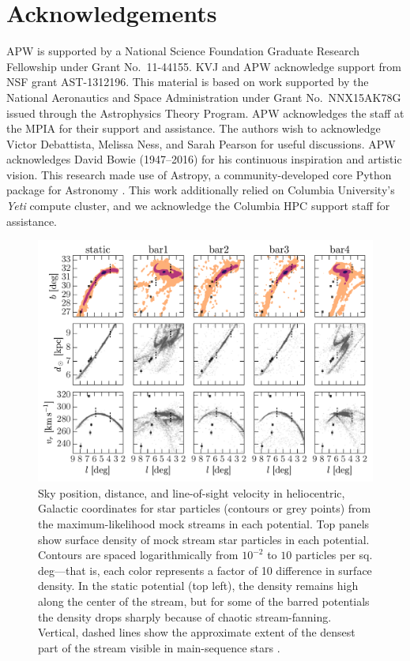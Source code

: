 \section*{Acknowledgements}
APW is supported by a National Science Foundation Graduate Research Fellowship under Grant No.\ 11-44155.
KVJ and APW acknowledge support from NSF grant AST-1312196. 
This material is based on work supported by the National Aeronautics and Space Administration under Grant No.\, NNX15AK78G issued through the Astrophysics Theory Program. 
APW acknowledges the staff at the MPIA for their support and assistance.
The authors wish to acknowledge Victor Debattista, Melissa Ness, and Sarah Pearson for useful discussions.
APW acknowledges David Bowie (1947--2016) for his continuous inspiration and artistic vision.
This research made use of Astropy, a community-developed core Python package for Astronomy \citep{astropy13}.
This work additionally relied on Columbia University's \emph{Yeti} compute cluster, and we acknowledge the Columbia HPC support staff for assistance. \\



\begin{figure}[p]
\begin{center}
\includegraphics[width=\textwidth]{figures/ch4/mockstream0}
\caption{ Sky position, distance, and line-of-sight velocity in heliocentric, Galactic coordinates for star particles (contours or grey points) from the maximum-likelihood mock streams in each potential. Top panels show surface density of mock stream star particles in each potential. Contours are spaced logarithmically from $10^{-2}$ to $10$ particles per sq. deg---that is, each color represents a factor of 10 difference in surface density. In the static potential (top left), the density remains high along the center of the stream, but for some of the barred potentials the density drops sharply because of chaotic stream-fanning. Vertical, dashed lines show the approximate extent of the densest part of the stream visible in main-sequence stars \citep[the segment originally detected in ][]{bernard14}.}
\label{fig:mockstream0}
\end{center}
\end{figure}


